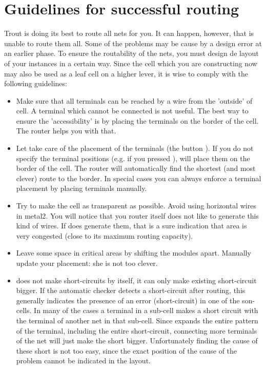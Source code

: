 \section{Guidelines for successful routing}
\label{routeguidelines}
Trout is doing its best to route all nets for you. It can
happen, however, that  is unable to route them
all. Some of the problems may be cause by a design error at
an earlier phase. To ensure the routability of the nets,
you must design de layout of your instances in a certain
way. Since the cell which you are constructing now may also be
used as a leaf cell on a higher lever, it is wise to comply
with the following guidelines:
\begin{itemize}
\item
Make sure that all terminals can be reached by a wire from
the 'outside' of cell. A terminal which cannot be connected
is not useful. The best way to ensure the 'accessibility'
is by placing the terminals on the border of the cell. The
router helps you with that.
\item
Let  take care of the placement of the terminals (the button
). If you do not specify the terminal 
positions (e.g. if you pressed ),  will place
them on the border of the cell. The router will automatically find the shortest
(and most clever) route to the border. In special cases you can always enforce
a terminal placement by placing terminals manually.
\item
Try to make the cell as transparent as possible. Avoid using horizontal wires
in metal2. You will notice that you router itself does not like to generate
this kind of wires.  If  does generate them, that is a sure
indication that area is very congested (close to its maximum routing
capacity).
\item
Leave some space in critical areas by shifting the modules apart. Manually
update your  placement: she is not too clever.
\item
{}
 does not make short-circuits by itself, it can only make
existing short-circuit bigger.
If the automatic checker detects a short-circuit after
routing, this generally indicates the presence of an error (short-circuit) in
one of the son-cells.  In many of the cases a terminal in a sub-cell makes a
short circuit with the terminal of another net in that sub-cell. Since
 expands the entire pattern of the terminal, including the entire
short-circuit, connecting more terminals of the net will just make the short
bigger. Unfortunately finding the cause of these short is not too easy, since
the exact position of the cause of the problem cannot be indicated in the
layout.
\end{itemize}

